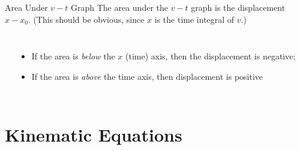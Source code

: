\documentclass[12pt,compress,aspectratio=169]{beamer}
\begin{document}
\begin{frame}{Area Under $v-t$ Graph}
  The area under the $v-t$ graph is the displacement $x-x_0$. (This should be
  obvious, since $x$ is the time integral of $v$.)
  \begin{columns}
    \begin{center}
    \end{center}
    
    \begin{itemize}
    \item If the area is \textcolor{red!40}{\emph{below}} the $x$ (time) axis,
      then the displacement is negative;
    \item If the area is \textcolor{blue!20}{\emph{above}} the time axis, then
      displacement is positive
    \end{itemize}
  \end{columns}
\end{frame}



\section{Kinematic Equations}
\end{document}
